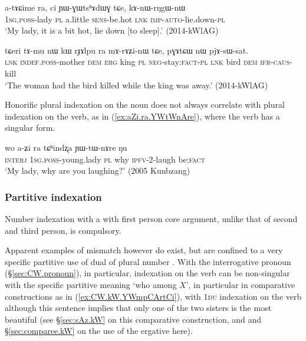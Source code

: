 \begin{exe}
\ex \label{ex:atACime.kAnWrNgWnW}
\gll a-tɤɕime ra, ci ɲɯ-ɣɯtsʰɤdɯɣ tɕe, kɤ-nɯ-rŋgɯ-nɯ \\
\textsc{1sg}.\textsc{poss}-lady \textsc{pl} a.little \textsc{sens}-be.hot \textsc{lnk} \textsc{imp}-\textsc{auto}-lie.down-\textsc{pl} \\
\glt `My lady, it is a bit hot, lie down [to sleep].' (2014-kWlAG)
\end{exe}

\begin{exe}
\ex \label{ex:rJAlpu.mArAZinW}
\gll  tɕeri tɤ-mu nɯ kɯ rɟɤlpu ra mɤ-rɤʑi-nɯ tɕe, pɣɤtɕɯ nɯ pjɤ-sɯ-sat. \\
\textsc{lnk} \textsc{indef}.\textsc{poss}-mother \textsc{dem} \textsc{erg} king \textsc{pl} \textsc{neg}-stay:\textsc{fact}-\textsc{pl} \textsc{lnk} bird \textsc{dem} \textsc{ifr}-\textsc{caus}-kill \\
\glt `The woman had the bird killed while the king was away.' (2014-kWlAG)
\end{exe}

Honorific plural indexation on the noun does not always correlate with plural indexation on the verb, as in (\ref{ex:aZi.ra.YWtWnAre}), where the verb has a singular form.

\begin{exe}
\ex \label{ex:aZi.ra.YWtWnAre}
\gll wo a-ʑi ra tɕʰindʐa ɲɯ-tɯ-nɤre ŋu \\
\textsc{interj} \textsc{1sg}.\textsc{poss}-young.lady \textsc{pl} why \textsc{ipfv}-2-laugh be:\textsc{fact} \\
\glt `My lady, why are you laughing?' (2005 Kunbzang)
\end{exe}



\subsubsection{Partitive indexation} \label{sec:partitive.indexation}
Number indexation with a with first person core argument, unlike that of second and third person, is compulsory. 

Apparent examples of mismatch however do exist, but are confined to a very specific partitive use of dual of plural number \citep{bickel00agreement}. With the interrogative pronoun  (§\ref{sec:CW.pronoun}), in particular, indexation on the verb can be non-singular with the specific partitive meaning `who among $X$', in particular in comparative constructions as in (\ref{ex:CW.kW.YWmpCArtCi}), with \textsc{1du} indexation on the verb although this sentence implies that only one of the two sisters is the most beautiful (see §\ref{sec:sAz.kW} on this comparative construction, and \citet{jacques16comparative} and §\ref{sec:comparee.kW} on the use of the ergative here).

